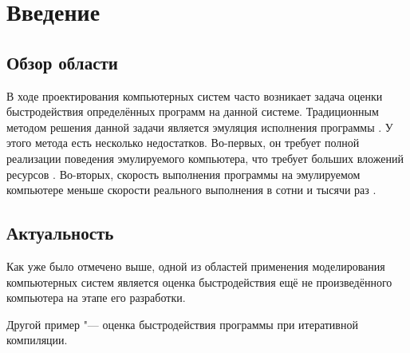 \section*{Введение}
\subsection*{Обзор области}
В ходе проектирования компьютерных систем часто возникает задача оценки быстродействия определённых программ на данной системе. Традиционным методом решения данной задачи является эмуляция исполнения программы \cite{emulation}. У этого метода есть несколько недостатков. Во-первых, он требует полной реализации поведения эмулируемого компьютера, что требует больших вложений ресурсов \cite{emulation-complexity}. Во-вторых, скорость выполнения программы на эмулируемом компьютере меньше скорости реального выполнения в сотни и тысячи раз \cite{emulation-speed}.
\subsection*{Актуальность}
Как уже было отмечено выше, одной из областей применения моделирования компьютерных систем является оценка быстродействия ещё не произведённого компьютера на этапе его разработки.

Другой пример "--- оценка быстродействия программы при итеративной компиляции.